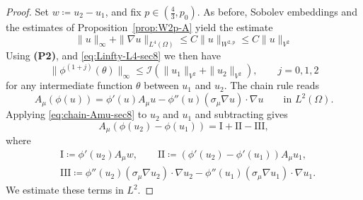 \documentclass[12pt,leqno]{amsart}
\theoremstyle{definition}
\numberwithin{equation}{section}
\numberwithin{figure}{section}
\begin{document}
\begin{proof}
Set $w\coloneqq u_2-u_1$, and fix $p\in (\frac43,p_0)$. As before, Sobolev embeddings and  the estimates of Proposition~\ref{prop:W2p-A}   
yield the estimate 
\begin{equation}\label{eq:Linfty-L4-sec8}
\|u\|_{\infty}+\|\nabla u\|_{L^4(\Omega)}\le C\|u\|_{W^{2,p}}\le C\|u\|_{{V^2}}
\end{equation}
Using \textbf{(P2)}, and \eqref{eq:Linfty-L4-sec8} we then have 
\begin{equation}\label{eq:phi-derivs-bdd-sec8}
\|\phi^{(1+j)}(\theta)\|_{\infty}\le \mathcal I(\|u_1\|_{{V^2}}+ \|u_2\|_{{V^2}}), \qquad j=0,1,2\end{equation}
for any intermediate function $\theta$ between $u_1$ and $u_2$.
The chain rule reads
\begin{equation}\label{eq:chain-Amu-sec8}
A_\mu(\phi(u))=\phi'(u)A_\mu u-\phi''(u)(\sigma_\mu\nabla u)\cdot\nabla u
\qquad\text{in }L^2(\Omega).
\end{equation}
Applying \eqref{eq:chain-Amu-sec8} to $u_2$ and $u_1$ and subtracting gives
\[
A_\mu(\phi(u_2)-\phi(u_1))=\mathrm{I}+\mathrm{II}-\mathrm{III},
\]
where
\[
\begin{split}&
\mathrm{I}\coloneqq \phi'(u_2)A_\mu w,
\qquad
\mathrm{II}\coloneqq \left(\phi'(u_2)-\phi'(u_1)\right)A_\mu u_1,
\\
&
\mathrm{III}\coloneqq
\phi''(u_2)(\sigma_\mu\nabla u_2)\cdot\nabla u_2
-\phi''(u_1)(\sigma_\mu\nabla u_1)\cdot\nabla u_1.
\end{split}
\]
We estimate these terms in $L^2$.


\end{proof}
\end{document}
